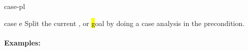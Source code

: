 \begin{tactic}[case]{case-pl}
  \begin{tsyntax}{case e}
  Split the current \prhl, \phl or \hl goal by doing a case analysis
  in the precondition.

  \paragraph{Examples:}\strut

  \begin{cmathpar}
      { \\
       }
      {}

      { \\
       }
      {}

      { \\
       }
      {}
  \end{cmathpar}
  \end{tsyntax}
\end{tactic}
